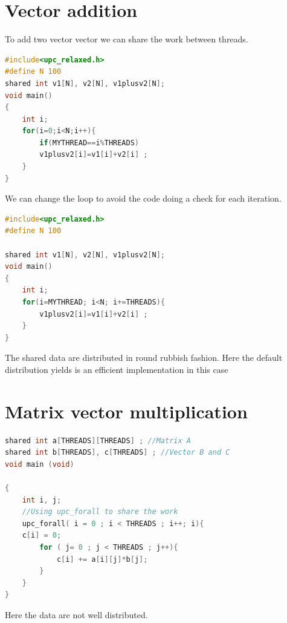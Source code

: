 \documentclass{report}
\begin{document}
\section{Vector addition}

To add two vector vector we can share the work between threads.

\begin{lstlisting}[language=C]
#include<upc_relaxed.h> 
#define N 100 
shared int v1[N], v2[N], v1plusv2[N]; 
void main() 
{ 
    int i; 
    for(i=0;i<N;i++){
        if(MYTHREAD==i%THREADS) 
        v1plusv2[i]=v1[i]+v2[i] ; 
    }
}
\end{lstlisting}

We can change the loop to avoid the code doing a check for each iteration.

\begin{lstlisting}[language=C]
#include<upc_relaxed.h> 
#define N 100 

shared int v1[N], v2[N], v1plusv2[N]; 
void main() 
{ 
    int i; 
    for(i=MYTHREAD; i<N; i+=THREADS){
        v1plusv2[i]=v1[i]+v2[i] ; 
    }
}
\end{lstlisting}

The shared data are distributed in round rubbish fashion. Here the default distribution yields is an efficient implementation in this case

\section{Matrix vector multiplication}

\begin{lstlisting}[language=C]
shared int a[THREADS][THREADS] ; //Matrix A
shared int b[THREADS], c[THREADS] ; //Vector B and C
void main (void) 

{
    int i, j; 
    //Using upc_forall to share the work
    upc_forall( i = 0 ; i < THREADS ; i++; i){
    c[i] = 0;
        for ( j= 0 ; j < THREADS ; j++){
            c[i] += a[i][j]*b[j];
        }
    }
}
\end{lstlisting}

Here the data are not well distributed.
\end{document}
